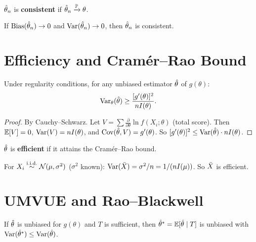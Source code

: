 \begin{definition}
$\hat{\theta}_n$ is \textbf{consistent} if $\hat{\theta}_n \xrightarrow{\mathbb{P}} \theta$.
\end{definition}

\begin{proposition}
If $\operatorname{Bias}(\hat{\theta}_n)\to 0$ and $\operatorname{Var}(\hat{\theta}_n)\to 0$, then $\hat{\theta}_n$ is consistent.
\end{proposition}

\section{Efficiency and Cram\'er--Rao Bound}

\begin{theorem}
\label{thm:cramer-rao}
Under regularity conditions, for any unbiased estimator $\hat{\theta}$ of $g(\theta)$:
\[
\operatorname{Var}_\theta(\hat{\theta}) \geq \frac{[g'(\theta)]^2}{nI(\theta)}.
\]
\end{theorem}

\begin{proof}
By Cauchy--Schwarz. Let $V=\sum\frac{\partial}{\partial\theta}\ln f(X_i;\theta)$ (total score). Then $\mathbb{E}[V]=0$, $\operatorname{Var}(V)=nI(\theta)$, and $\operatorname{Cov}(\hat{\theta},V)=g'(\theta)$. So $[g'(\theta)]^2\leq\operatorname{Var}(\hat{\theta})\cdot nI(\theta)$.
\end{proof}

\begin{definition}
$\hat{\theta}$ is \textbf{efficient} if it attains the Cram\'er--Rao bound.
\end{definition}

\begin{example}
For $X_i\overset{\text{i.i.d.}}{\sim}\mathcal{N}(\mu,\sigma^2)$ ($\sigma^2$ known): $\operatorname{Var}(\bar{X})=\sigma^2/n=1/(nI(\mu))$. So $\bar{X}$ is efficient.
\end{example}

\section{UMVUE and Rao--Blackwell}

\begin{theorem}
If $\hat{\theta}$ is unbiased for $g(\theta)$ and $T$ is sufficient, then $\hat{\theta}^*=\mathbb{E}[\hat{\theta}\mid T]$ is unbiased with $\operatorname{Var}(\hat{\theta}^*)\leq\operatorname{Var}(\hat{\theta})$.
\end{theorem}

